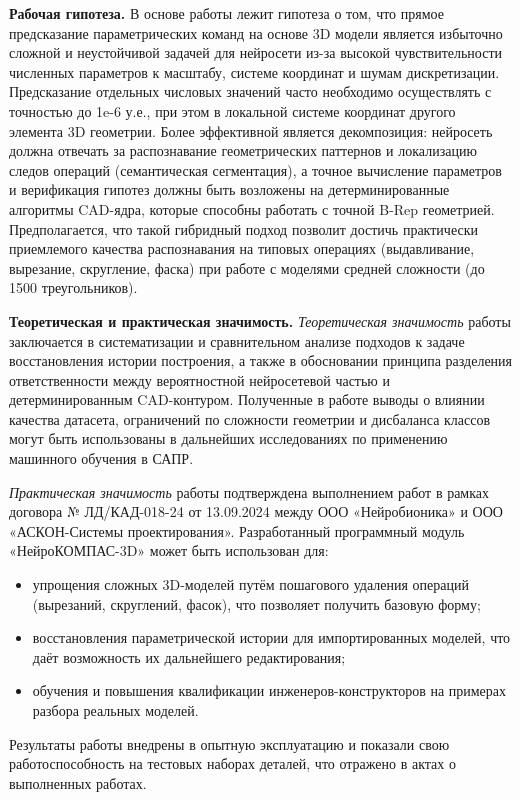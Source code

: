 \textbf{Рабочая гипотеза.} В основе работы лежит гипотеза о том, что прямое предсказание параметрических команд на основе 3D модели является избыточно сложной и неустойчивой задачей для нейросети из-за высокой чувствительности численных параметров к масштабу, системе координат и шумам дискретизации. Предсказание отдельных числовых значений часто необходимо осуществлять с точностью до 1e-6 у.е., при этом в локальной системе координат другого элемента 3D геометрии. Более эффективной является декомпозиция: нейросеть должна отвечать за распознавание геометрических паттернов и локализацию следов операций (семантическая сегментация), а точное вычисление параметров и верификация гипотез должны быть возложены на детерминированные алгоритмы CAD-ядра, которые способны работать с точной B-Rep геометрией. Предполагается, что такой гибридный подход позволит достичь практически приемлемого качества распознавания на типовых операциях (выдавливание, вырезание, скругление, фаска) при работе с моделями средней сложности (до 1500 треугольников).

\textbf{Теоретическая и практическая значимость.} 
\textit{Теоретическая значимость} работы заключается в систематизации и сравнительном анализе подходов к задаче восстановления истории построения, а также в обосновании принципа разделения ответственности между вероятностной нейросетевой частью и детерминированным CAD-контуром. Полученные в работе выводы о влиянии качества датасета, ограничений по сложности геометрии и дисбаланса классов могут быть использованы в дальнейших исследованиях по применению машинного обучения в САПР.

\textit{Практическая значимость} работы подтверждена выполнением работ в рамках договора № ЛД/КАД-018-24 от 13.09.2024 между ООО «Нейробионика» и ООО «АСКОН-Системы проектирования». Разработанный программный модуль «НейроКОМПАС-3D» может быть использован для:
\begin{itemize}
    \item упрощения сложных 3D-моделей путём пошагового удаления операций (вырезаний, скруглений, фасок), что позволяет получить базовую форму;
    \item восстановления параметрической истории для импортированных моделей, что даёт возможность их дальнейшего редактирования;
    \item обучения и повышения квалификации инженеров-конструкторов на примерах разбора реальных моделей.
\end{itemize}
Результаты работы внедрены в опытную эксплуатацию и показали свою работоспособность на тестовых наборах деталей, что отражено в актах о выполненных работах.

